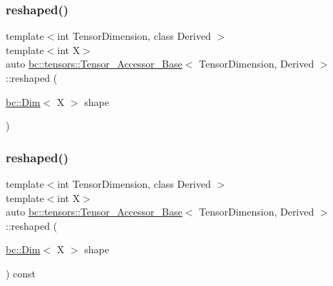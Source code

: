 \mbox{\label{classbc_1_1tensors_1_1Tensor__Accessor__Base_a53d11cb7a5e63833e5de0f68d3a4d941}} 
\subsubsection{\texorpdfstring{reshaped()}{reshaped()}\hspace{0.1cm}{\footnotesize\ttfamily [1/4]}}
{\footnotesize\ttfamily template$<$int Tensor\+Dimension, class Derived $>$ \\
template$<$int X$>$ \\
auto \hyperlink{classbc_1_1tensors_1_1Tensor__Accessor__Base}{bc\+::tensors\+::\+Tensor\+\_\+\+Accessor\+\_\+\+Base}$<$ Tensor\+Dimension, Derived $>$\+::reshaped (\begin{DoxyParamCaption}\item[{\hyperlink{structbc_1_1Dim}{bc\+::\+Dim}$<$ X $>$}]{shape }\end{DoxyParamCaption})\hspace{0.3cm}{\ttfamily [inline]}}

\mbox{\label{classbc_1_1tensors_1_1Tensor__Accessor__Base_ade90079525029aba491c53a769f958c1}} 
\subsubsection{\texorpdfstring{reshaped()}{reshaped()}\hspace{0.1cm}{\footnotesize\ttfamily [2/4]}}
{\footnotesize\ttfamily template$<$int Tensor\+Dimension, class Derived $>$ \\
template$<$int X$>$ \\
auto \hyperlink{classbc_1_1tensors_1_1Tensor__Accessor__Base}{bc\+::tensors\+::\+Tensor\+\_\+\+Accessor\+\_\+\+Base}$<$ Tensor\+Dimension, Derived $>$\+::reshaped (\begin{DoxyParamCaption}\item[{\hyperlink{structbc_1_1Dim}{bc\+::\+Dim}$<$ X $>$}]{shape }\end{DoxyParamCaption}) const\hspace{0.3cm}{\ttfamily [inline]}}

